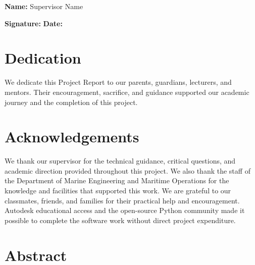 \documentclass[12pt,a4paper]{report}
\begin{document}
\vspace{0.8cm}
\noindent
\textbf{Name:} Supervisor Name

\vspace{1cm}
\noindent
\textbf{Signature:} \underline{\hspace{5cm}}
\hfill
\textbf{Date:} \underline{\hspace{4cm}}

\clearpage

\chapter*{Dedication}

We dedicate this Project Report to our parents, guardians, lecturers, and
mentors. Their encouragement, sacrifice, and guidance supported our academic
journey and the completion of this project.

\clearpage

\chapter*{Acknowledgements}

We thank our supervisor for the technical guidance, critical questions, and
academic direction provided throughout this project. We also thank the staff
of the Department of Marine Engineering and Maritime Operations for the
knowledge and facilities that supported this work. We are grateful to our
classmates, friends, and families for their practical help and encouragement.
Autodesk educational access and the open-source Python community made it
possible to complete the software work without direct project expenditure.

\clearpage

\chapter*{Abstract}
\end{document}
